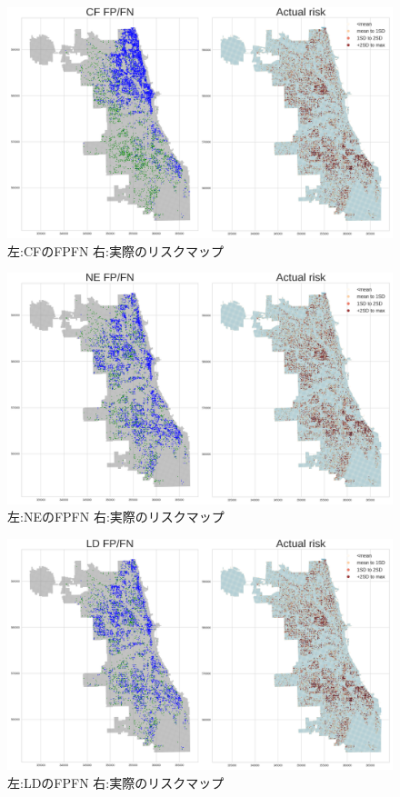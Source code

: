 \begin{figure}
  \centering %
  \includegraphics[scale=0.25]{./add-crime-timeseries-fig/CF_fnp.png}
  \caption{左:CFのFPFN 右:実際のリスクマップ}
  \label{fig:add-crime-timeseries-cf-fnp}
\end{figure}

\begin{figure}
  \centering %
  \includegraphics[scale=0.25]{./add-crime-timeseries-fig/NE_fnp.png}
  \caption{左:NEのFPFN 右:実際のリスクマップ}
  \label{fig:add-crime-timeseries-ne-fnp}
\end{figure}

\begin{figure}
  \centering %
  \includegraphics[scale=0.25]{./add-crime-timeseries-fig/LD_fnp.png}
  \caption{左:LDのFPFN 右:実際のリスクマップ}
  \label{fig:add-crime-timeseries-ld-fnp}
\end{figure}

